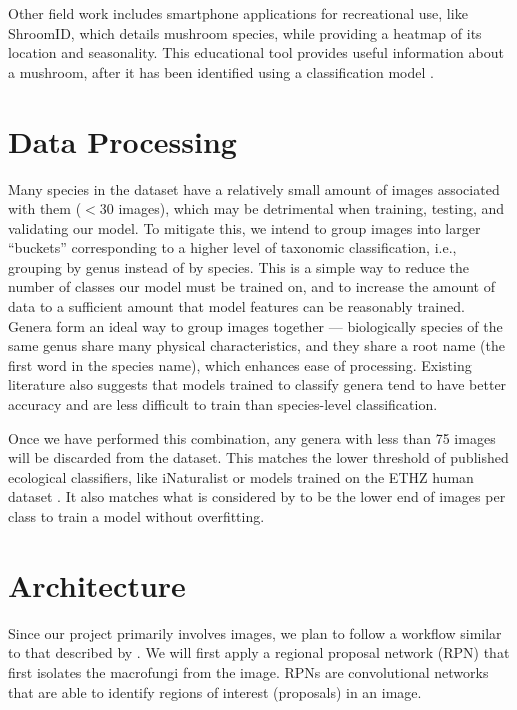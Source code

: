 \documentclass{article} %
\begin{document}
Other field work includes smartphone applications for recreational use, like ShroomID, which details mushroom species, while providing a heatmap of its location and seasonality. This educational tool provides useful information about a mushroom, after it has been identified using a classification model \citep{.ShroomID.2023}.

\section{Data Processing}
\label{data}

Many species in the dataset have a relatively small amount of images associated with them ($<30$ images), which may be detrimental when training, testing, and validating our model. To mitigate this, we intend to group images into larger “buckets” corresponding to a higher level of taxonomic classification, i.e., grouping by genus instead of by species. This is a simple way to reduce the number of classes our model must be trained on, and to increase the amount of data to a sufficient amount that model features can be reasonably trained. Genera form an ideal way to group images together — biologically species of the same genus share many physical characteristics, and they share a root name (the first word in the species name), which enhances ease of processing. Existing literature \citep{HollisterCaiEtAl.UsingComputerVision.2023} also suggests that models trained to classify genera tend to have better accuracy and are less difficult to train than species-level classification.

Once we have performed this combination, any genera with less than 75 images will be discarded from the dataset. This matches the lower threshold of published ecological classifiers, like iNaturalist \citep{Shepard.LatestComputerVision.2022} or models trained on the ETHZ human dataset \citep{SchneiderTaylorEtAl.PresentFutureApproaches.2019}. It also matches what is considered by \cite{FarleyMehrotaEtAl.ImprovingYourModel.2024} to be the lower end of images per class to train a model without overfitting.

\section{Architecture}
Since our project primarily involves images, we plan to follow a workflow similar to that described by \cite{S.RenK.HeEtAl.FasterRCNNRealTime.2017}. We will first apply a regional proposal network (RPN) that first isolates the macrofungi from the image. RPNs are convolutional networks that are able to identify regions of interest (proposals) in an image.
\end{document}

